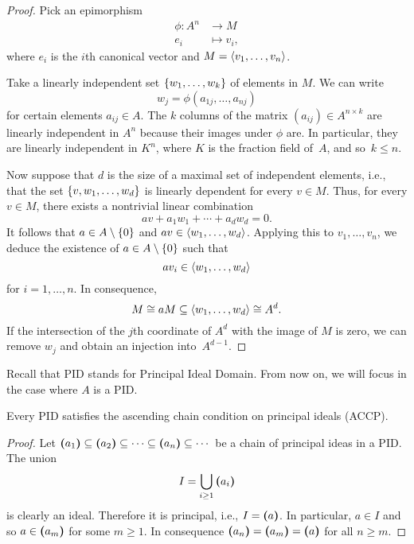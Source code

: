\begin{proof}
    Pick an epimorphism 
    \begin{align*}
        \phi\colon A^n&\to M\\
        e_i&\mapsto v_i,
    \end{align*}
    where $e_i$ is the $i$th canonical vector and $M=\langle v_1,\dots,v_n\rangle$.
    
    Take a linearly independent set $\{w_1,\dots,w_k\}$ of elements in $M$. We can write
    $$
        w_j = \phi(a_{1j},\dots,a_{nj})
    $$
    for certain elements $a_{ij}\in A$. The $k$ columns of the matrix $(a_{ij})\in A^{n\times k}$ are linearly independent in $A^n$ because their images under $\phi$ are. In particular, they are linearly independent in $K^n$, where $K$ is the fraction field of~$A$, and so~$k\le n$.

    Now suppose that $d$ is the size of a maximal set of independent elements, i.e., that the set $\{v,w_1,\dots,w_d\}$ is linearly dependent for every $v\in M$. Thus, for every $v\in M$, there exists a nontrivial linear combination
    $$
        av+a_1w_1+\cdots+a_dw_d=0.
    $$
    It follows that $a\in A\setminus\{0\}$ and $av\in\langle w_1,\dots,w_d\rangle$. Applying this to $v_1,\dots,v_n$, we deduce the existence of $a\in A\setminus\{0\}$ such that
    $$
        av_i\in\langle w_1,\dots,w_d\rangle
    $$
    for $i=1,\dots,n$. In consequence,
    $$
        M\cong aM\subseteq\langle w_1,\dots,w_d\rangle\cong A^d.
    $$
    If the intersection of the $j$th coordinate of $A^d$ with the image of $M$ is zero, we can remove $w_j$ and obtain an injection into~$A^{d-1}$.
\end{proof}

\separator

Recall that PID stands for Principal Ideal Domain. From now on, we will focus in the case where $A$ is a PID.

\medskip

\begin{lem}\label{lem:PID-implies-ACCP}
    Every PID satisfies the ascending chain condition on principal ideals {\rm(ACCP)}.
\end{lem}

\begin{proof}
    Let $\textrm{\boldmath$($}a_1\textrm{\boldmath$)$}\subseteq\textrm{\boldmath$($}a_2\textrm{\boldmath$)$}\subseteq\cdots\subseteq\textrm{\boldmath$($}a_n\textrm{\boldmath$)$}\subseteq\cdots$ be a chain of principal ideas in a PID. The union
    $$
        I = \bigcup_{i\ge1}\textrm{\boldmath$($}a_i\textrm{\boldmath$)$}
    $$
    is clearly an ideal. Therefore it is principal, i.e., $I=\textrm{\boldmath$($}a\textrm{\boldmath$)$}$. In particular, $a\in I$ and so $a\in\textrm{\boldmath$($}a_m\textrm{\boldmath$)$}$ for some $m\ge1$. In consequence $\textrm{\boldmath$($}a_n\textrm{\boldmath$)$}=\textrm{\boldmath$($}a_m\textrm{\boldmath$)$}=\textrm{\boldmath$($}a\textrm{\boldmath$)$}$ for all $n\ge m$.
\end{proof}

